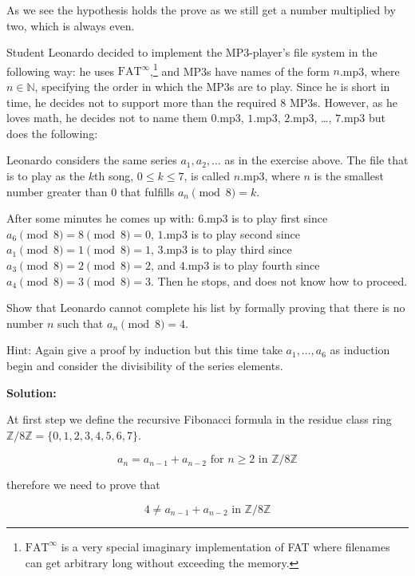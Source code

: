 \documentclass[12pt,a4paper,titlepage,oneside]{article}
\begin{document}
As we see the hypothesis holds the prove as we still get a number multiplied by two, which is always even.

 Student Leonardo
     decided to implement the MP3-player's file system in the
     following way: he uses
     $\text{FAT}^\infty$,\footnote{$\text{FAT}^\infty$ is a very
     special imaginary implementation of FAT where filenames can get
     arbitrary long without exceeding the memory.} and MP3s have names
     of the form $n$.mp3, where $n \in \mathds{N}$, specifying the
     order in which the MP3s are to play.
Since he is short in time, he decides not to support more than the
     required $8$ MP3s.
However, as he loves math, he decides not to name them $0$.mp3,
     $1$.mp3, $2$.mp3, \dots, $7$.mp3 but does the following:   

Leonardo considers the same series $a_1, a_2, \dots$ as in the
     exercise above.
The file that is to play as the $k$th song, $0\le k\le 7$, is called
     $n$.mp3, where $n$ is the smallest number greater than $0$ that
     fulfills $a_n \pmod 8 = k$.

After some minutes he comes up with: $6$.mp3 is to play first since
     $a_6 \pmod 8 =  8 \pmod 8 = 0$, $1$.mp3 is to play second since
     $a_1 \pmod 8 = 1 \pmod 8 = 1$, $3$.mp3 is to play third since
     $a_3 \pmod 8 = 2 \pmod 8 = 2$, and $4$.mp3 is to play fourth
     since $a_4 \pmod 8 = 3 \pmod 8 = 3$.
Then he stops, and does not know how to proceed.

Show that Leonardo cannot complete his list by formally proving that
     there is no number $n$ such that $a_n \pmod 8 = 4$.

Hint: Again give a proof by induction but this time take
     $a_1,\dots,a_6$ as induction begin and consider the divisibility
     of the series elements.

{\bf Solution:}

At first step we define the recursive Fibonacci formula in the residue class ring $\mathbb{Z}/8\mathbb{Z} = \{0,1,2,3,4,5,6,7\}$.

\begin{equation}
a_n = a_{n-1} + a_{n-2} \text{ for } n \ge 2 \text{ in } \mathbb{Z}/8\mathbb{Z}
\end{equation}

therefore we need to prove that

\begin{equation}
4 \neq a_{n-1} + a_{n-2} \text{ in } \mathbb{Z}/8\mathbb{Z}
\end{equation}
\end{document}
